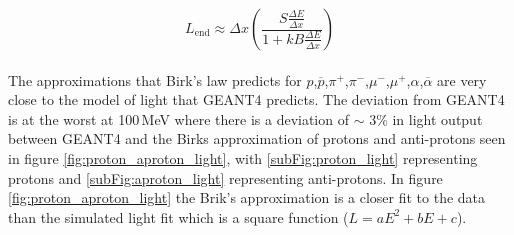 \begin{equation}
L_{\textrm{end}}\approx \Delta x \left(\frac{S\frac{\Delta E}{\Delta x}}{1 + kB \frac{\Delta E}{\Delta x}}\right) 
\label{equ:light_produced}
\end{equation}
\\The approximations that Birk's law predicts for $p$,$\overline{p}$,$\pi^+$,$\pi^-$,$\mu^-$,$\mu^+$,$\alpha$,$\overline{\alpha}$ are very close to the model of light that GEANT4 predicts. The deviation from GEANT4 is at the worst at 100\,MeV where there is a deviation of $\sim$ $3\%$ in light output between GEANT4 and the Birks approximation of protons and anti-protons seen in figure \ref{fig:proton_aproton_light}, with \ref{subFig:proton_light} representing protons and \ref{subFig:aproton_light} representing anti-protons. In figure \ref{fig:proton_aproton_light} the Brik's approximation is a closer fit to the data than the simulated light fit which is a square function ($L = aE^2 + bE+ c$).
